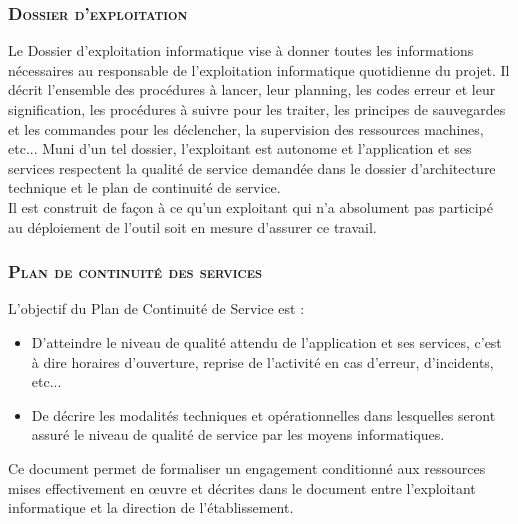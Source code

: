 \subsubsection{\textsc{Dossier d'exploitation}}
Le Dossier d'exploitation informatique vise à donner toutes les informations nécessaires au responsable de l'exploitation informatique quotidienne du projet. Il décrit l'ensemble des procédures à lancer, leur planning, les codes erreur et leur signification, les procédures à suivre pour les traiter, les principes de sauvegardes et les commandes pour les déclencher, la supervision des ressources machines, etc... Muni d'un tel dossier, l'exploitant est autonome et l'application et ses services respectent la qualité de service demandée dans le dossier d'architecture technique et le plan de continuité de service.
\\
Il est construit de façon à ce qu'un exploitant qui n'a absolument pas participé au déploiement de l'outil soit en mesure d'assurer ce travail.

\subsubsection{\textsc{Plan de continuité des services}}
L'objectif du Plan de Continuité de Service est :
\begin{itemize}[label=\textbullet]
 \item D'atteindre le niveau de qualité attendu de l'application et ses services, c'est à dire horaires d'ouverture, reprise de l'activité en cas d'erreur, d'incidents, etc...
 \item De décrire les modalités techniques et opérationnelles dans lesquelles seront assuré le niveau de qualité de service par les moyens informatiques.
\end{itemize}
Ce document permet de formaliser un engagement conditionné aux ressources mises effectivement en œuvre et décrites dans le document entre l'exploitant informatique et la direction de l'établissement.

